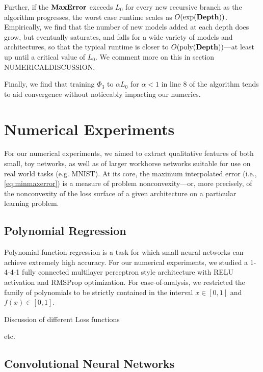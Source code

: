 \documentclass{article} %
\begin{document}
  Further, if the $\rm{\mathbf{MaxError}}$ exceeds $L_0$ for every new recursive branch as the algorithm progresses, the worst case runtime scales as $O(\rm{exp}(\rm{\mathbf{Depth}}))$.  Empirically, we find that the number of new models added at each depth does grow, but eventually saturates, and falls for a wide variety of models and architectures, so that the typical runtime is closer to $O(\rm{poly}(\rm{\mathbf{Depth}}))$---at least up until a critical value of $L_0$.  We comment more on this in section NUMERICALDISCUSSION.
  
  Finally, we find that training $\Phi_3$ to $\alpha L_0$ for $\alpha < 1$ in line $8$ of the algorithm tends to aid convergence without noticeably impacting our numerics.
 

 
\section{Numerical Experiments}
\label{sec:NumExp}

For our numerical experiments, we aimed to extract qualitative features of both small, toy networks, as well as of larger workhorse networks suitable for use on real world tasks (e.g. MNIST).  At its core, the maximum interpolated error (i.e., \eqref{eq:minmaxerror}) is a measure of problem nonconvexity---or, more precisely, of the nonconvexity of the loss surface of a given architecture on a particular learning problem.


\subsection{Polynomial Regression}
\label{sec:PolyFuncs}

 Polynomial function regression is a task for which small neural networks can achieve extremely high accuracy.  For our numerical experiments, we studied a 1-4-4-1 fully connected multilayer perceptron style architecture with RELU activation and RMSProp optimization.  For ease-of-analysis, we restricted the family of polynomials to be strictly contained in the interval $x\in[0,1]$ and $f(x)\in[0,1]$.
 
 Discussion of different Loss functions
 
 etc.


\subsection{Convolutional Neural Networks}
\label{sec:CNN}
\end{document}
